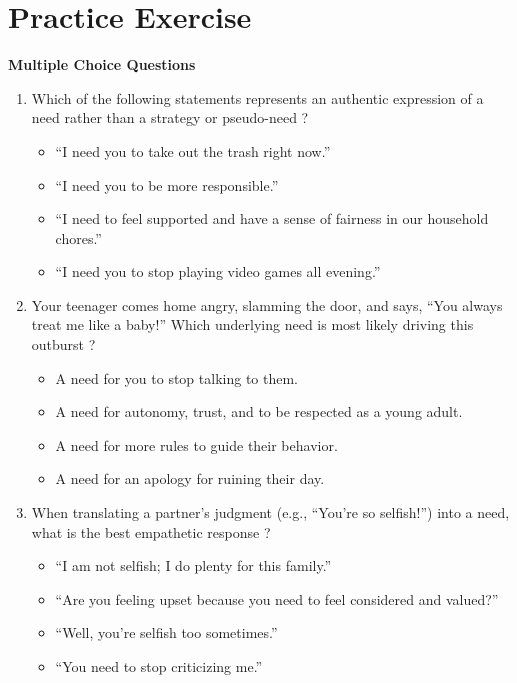 \section{Practice Exercise}
\begin{practiceexercise}
\textbf{Multiple Choice Questions}
\begin{enumerate}
  \item Which of the following statements represents an authentic expression of a need rather than a strategy or pseudo-need \citep{gordon1970}?
    \begin{itemize}
      \item[A)] ``I need you to take out the trash right now.'' \citep{cohen2001}
      \item[B)] ``I need you to be more responsible.'' \citep{kohn2005}
      \item[C)] ``I need to feel supported and have a sense of fairness in our household chores.''
      \item[D)] ``I need you to stop playing video games all evening.''
    \end{itemize}
  \vspace{\fill}
  \item Your teenager comes home angry, slamming the door, and says, ``You always treat me like a baby!'' Which underlying need is most likely driving this outburst \citep{brown2012}?
    \begin{itemize}
      \item[A)] A need for you to stop talking to them. \citep{dweck2006}
      \item[B)] A need for autonomy, trust, and to be respected as a young adult.
      \item[C)] A need for more rules to guide their behavior.
      \item[D)] A need for an apology for ruining their day.
    \end{itemize}
  \vspace{\fill}
  \item When translating a partner's judgment (e.g., ``You're so selfish!'') into a need, what is the best empathetic response \citep{bowlby1969}?
    \begin{itemize}
      \item[A)] ``I am not selfish; I do plenty for this family.''
      \item[B)] ``Are you feeling upset because you need to feel considered and valued?''
      \item[C)] ``Well, you're selfish too sometimes.''
      \item[D)] ``You need to stop criticizing me.''
    \end{itemize}
\end{enumerate}
\vspace{\fill}
\newpage


\end{practiceexercise}
